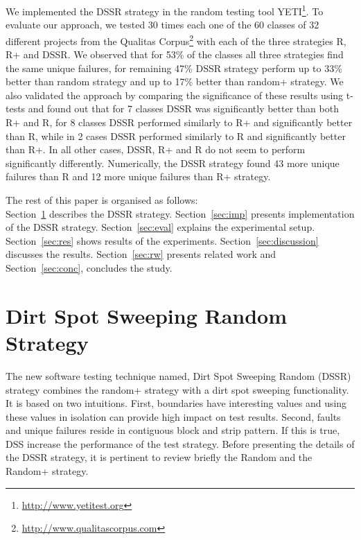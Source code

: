 \documentclass[conference]{IEEEtran}
\begin{document}
We implemented the DSSR strategy in the random testing tool YETI\footnote{\url{http://www.yetitest.org}}. To evaluate our approach, we tested 30 times each one of the 60 classes of 32 different projects from the Qualitas Corpus\footnote{\url{http://www.qualitascorpus.com}} with each of the three strategies R, R+ and DSSR. We observed that for 53\% of the classes all three strategies find the same unique failures, for remaining 47\% DSSR strategy perform up to 33\% better than random strategy and up to 17\% better than random+ strategy.
We also validated the approach by comparing the significance of these results using t-tests and found out that for 7 classes DSSR was significantly better than both R+ and R, for 8 classes DSSR performed similarly to R+ and significantly better than R, while in 2 cases DSSR performed similarly to R and significantly better than R+. In all other cases, DSSR, R+ and R do not seem to perform significantly differently.
Numerically, the DSSR strategy found 43 more unique failures than R and 12 more unique failures than R+ strategy. 

The rest of this paper is organised as follows: \\ Section~\ref{sec:dssr} describes the DSSR strategy. Section~\ref{sec:imp} presents implementation of the DSSR strategy. Section~\ref{sec:eval} explains the experimental setup. Section~\ref{sec:res} shows results of the experiments. Section~\ref{sec:discussion} discusses the results. Section~\ref{sec:rw} presents related work and Section~\ref{sec:conc}, concludes the study.





\section{Dirt Spot Sweeping Random Strategy}\label{sec:dssr}
The new software testing technique named, Dirt Spot Sweeping Random (DSSR) strategy combines the random+ strategy with a dirt spot sweeping functionality. It is based on two intuitions. First, boundaries have interesting values and using these values in isolation can provide high impact on test results. Second, faults and unique failures reside in contiguous block and strip pattern. If this is true, DSS increase the performance of the test strategy. Before presenting the details of the DSSR strategy, it is pertinent to review briefly the Random and the Random+ strategy.
\end{document}
